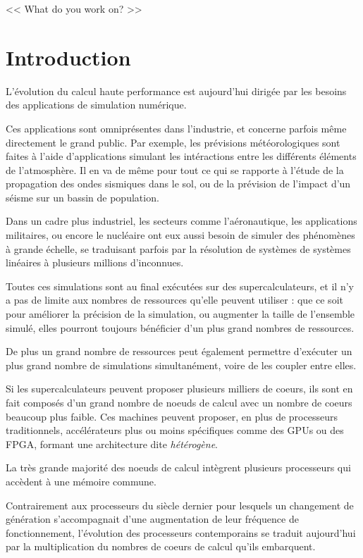 \begin{savequote}[6cm]
<< What do you work on?  >>
\end{savequote}
\chapter{Introduction}
\chaptertoc

L'évolution du calcul haute performance est aujourd'hui dirigée par les besoins des applications de simulation numérique.

Ces applications sont omniprésentes dans l'industrie, et concerne parfois même directement le grand public.
Par exemple, les prévisions météorologiques sont faites à l'aide d'applications simulant les intéractions entre les différents éléments de l'atmosphère.
Il en va de même pour tout ce qui se rapporte à l'étude de la propagation des ondes sismiques dans le sol, ou de la prévision de l'impact d'un séisme sur un bassin de population.

Dans un cadre plus industriel, les secteurs comme l'aéronautique, les applications militaires, ou encore le nucléaire ont eux aussi besoin de simuler des phénomènes à grande échelle, se traduisant parfois par la résolution de systèmes de systèmes linéaires à plusieurs millions d'inconnues.

Toutes ces simulations sont au final exécutées sur des supercalculateurs, et il n'y a pas de limite aux nombres de ressources qu'elle peuvent utiliser : que ce soit pour améliorer la précision de la simulation, ou augmenter la taille de l'ensemble simulé, elles pourront toujours bénéficier d'un plus grand nombres de ressources.

De plus un grand nombre de ressources peut également permettre d'exécuter un plus grand nombre de simulations simultanément, voire de les coupler entre elles.

Si les supercalculateurs peuvent proposer plusieurs milliers de coeurs, ils sont en fait composés d'un grand nombre de noeuds de calcul avec un nombre de coeurs beaucoup plus faible.
Ces machines peuvent proposer, en plus de processeurs traditionnels, accélérateurs plus ou moins spécifiques comme des GPUs ou des FPGA, formant une architecture dite \emph{hétérogène}.

La très grande majorité des noeuds de calcul intègrent plusieurs processeurs qui accèdent à une mémoire commune.

Contrairement aux processeurs du siècle dernier pour lesquels un changement de génération s'accompagnait d'une augmentation de leur fréquence de fonctionnement, l'évolution des processeurs contemporains se traduit aujourd'hui par la multiplication du nombres de coeurs de calcul qu'ils embarquent.

